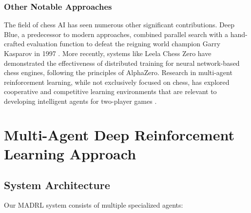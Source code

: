 \documentclass[conference]{IEEEtran}
\begin{document}
\subsubsection{Other Notable Approaches}
The field of chess AI has seen numerous other significant contributions. Deep Blue, a predecessor to modern approaches, combined parallel search with a hand-crafted evaluation function to defeat the reigning world champion Garry Kasparov in 1997 \cite{b3}. More recently, systems like Leela Chess Zero have demonstrated the effectiveness of distributed training for neural network-based chess engines, following the principles of AlphaZero. Research in multi-agent reinforcement learning, while not exclusively focused on chess, has explored cooperative and competitive learning environments that are relevant to developing intelligent agents for two-player games \cite{b6, b11, b12, b13, b14, b15}.

\section{Multi-Agent Deep Reinforcement Learning Approach}

\subsection{System Architecture}
Our MADRL system consists of multiple specialized agents:
\end{document}
